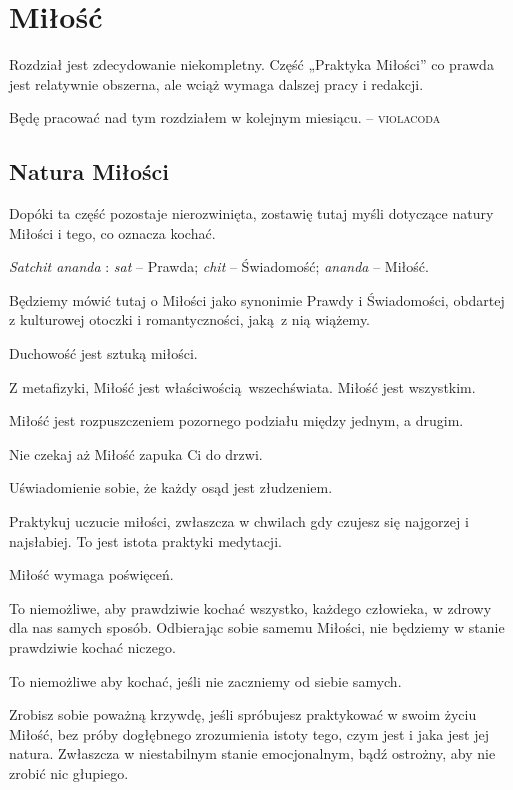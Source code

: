 \documentclass[../dotknieci-miloscia.tex]{subfiles}
\begin{document}
\section{Miłość}
\label{sztuka/milosc}
Rozdział jest zdecydowanie niekompletny. Część „Praktyka Miłości” co prawda jest relatywnie obszerna, 
ale wciąż wymaga dalszej pracy i redakcji.

Będę pracować nad tym rozdziałem w kolejnym miesiącu.
\quad \textsc{-- violacoda}

\ornamentbreak
\vspace*{-1em}
\begin{multicols}{2}


\subsection{Natura Miłości}
\label{sztuka/milosc/definicja}

Dopóki ta część pozostaje nierozwinięta, 
zostawię tutaj myśli dotyczące natury Miłości i tego, co oznacza kochać.

\emph{Satchit ananda} : \emph{sat} -- Prawda; \emph{chit} -- Świadomość; \emph{ananda} -- Miłość.

Będziemy mówić tutaj o Miłości jako synonimie Prawdy i Świadomości, 
obdartej z kulturowej otoczki i romantyczności, jaką z nią wiążemy.

Duchowość jest sztuką miłości.

Z metafizyki, Miłość jest właściwością wszechświata.
Miłość jest wszystkim.

Miłość jest rozpuszczeniem pozornego podziału między jednym, a drugim.

Nie czekaj aż Miłość zapuka Ci do drzwi.

Uświadomienie sobie, że każdy osąd jest złudzeniem.

Praktykuj uczucie miłości, zwłaszcza w chwilach gdy czujesz się najgorzej i najsłabiej.
To jest istota praktyki medytacji.

Miłość wymaga poświęceń. 

To niemożliwe, aby prawdziwie kochać wszystko, każdego człowieka, w zdrowy dla nas samych sposób.
Odbierając sobie samemu Miłości, nie będziemy w stanie prawdziwie kochać niczego.

To niemożliwe aby kochać, jeśli nie zaczniemy od siebie samych. 

Zrobisz sobie poważną krzywdę, jeśli spróbujesz praktykować w swoim życiu Miłość,
bez próby dogłębnego zrozumienia istoty tego, czym jest i jaka jest jej natura.
Zwłaszcza w niestabilnym stanie emocjonalnym, bądź ostrożny, aby nie zrobić nic głupiego.


\end{multicols}
\end{document}

